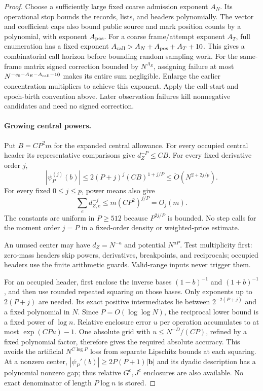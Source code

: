 \documentclass[11pt]{article}
\theoremstyle{remark}
\newcommand{\bb}{\mathbf b}
\renewcommand{\O}{\ddot{O}}
\begin{document}
\begin{proof}
Choose a sufficiently large fixed coarse admission exponent $A_N$.
Its operational stop bounds the records, lists, and headers polynomially.
The vector and coefficient caps also bound public source and mark position
counts by a polynomial, with exponent $A_{\rm pos}$.
For a coarse frame/attempt exponent $A_T$, full enumeration has a fixed exponent
$A_{\rm call}>A_N+A_{\rm pos}+A_T+10$.
This gives a combinatorial call horizon before bounding random sampling work.
For the same-frame matrix signed correction bounded by $N^{A_E}$, assigning
failure at most $N^{-c_0-A_E-A_{\rm call}-10}$ makes its entire sum negligible.
Enlarge the earlier concentration multipliers to achieve this exponent.
Apply the call-start and epoch-birth convention above.
Later observation failures kill nonnegative candidates and need no signed
correction.

\paragraph{Growing central powers.}\label{par:ram30-central-powers}
Put $B=CP^2m$ for the expanded central allowance.
For every occupied central header its representative comparisons give
$d_Z^{-P}\le CB$.
For every fixed derivative order $j$,
\[
 |\psi_P^{(j)}(b)|
 \le 2(P+j)^j(CB)^{1+j/P}
 \le \O(N^{2+2j/p}).
\]
For every fixed $0\le j\le p$, power means also give
\[
 \sum_e d_{Z,e}^{-j}
       \le m(CP^2)^{j/P}=O_j(m).
\]
The constants are uniform in $P\ge512$ because $P^{2j/P}$ is bounded.
No step calls for the moment order $j=P$ in a fixed-order density or
weighted-price estimate.

An unused center may have $d_Z=N^{-a}$ and potential $N^{aP}$.
Test multiplicity first: zero-mass headers skip powers, derivatives,
breakpoints, and reciprocals; occupied headers use the finite arithmetic guards.
Valid-range inputs never trigger them.

For an occupied header, first enclose the inverse bases $(1-b)^{-1}$ and
$(1+b)^{-1}$, and then use rounded repeated squaring on those bases.
Only exponents up to $2(P+j)$ are needed.
Its exact positive intermediates lie between $2^{-2(P+j)}$ and a fixed
polynomial in $N$.
Since $P=O(\log\log N)$, the reciprocal lower bound is a fixed power of $\log n$.
Relative enclosure error $u$ per operation accumulates to at most $\exp(CPu)-1$.
One absolute grid with $u\le N^{-D}/(CP)$, refined by a fixed polynomial factor,
therefore gives the required absolute accuracy.
This avoids the artificial $N^{C\log P}$ loss from separate Lipschitz bounds at
each squaring.
At a nonzero center, $|\psi_P'(b)|\ge2P(P+1)|\bb|$ and its dyadic description has
a polynomial nonzero gap; thus relative $G^c,J^c$ enclosures are also available.
No exact denominator of length $P \log n$ is stored.


\end{proof}
\end{document}
